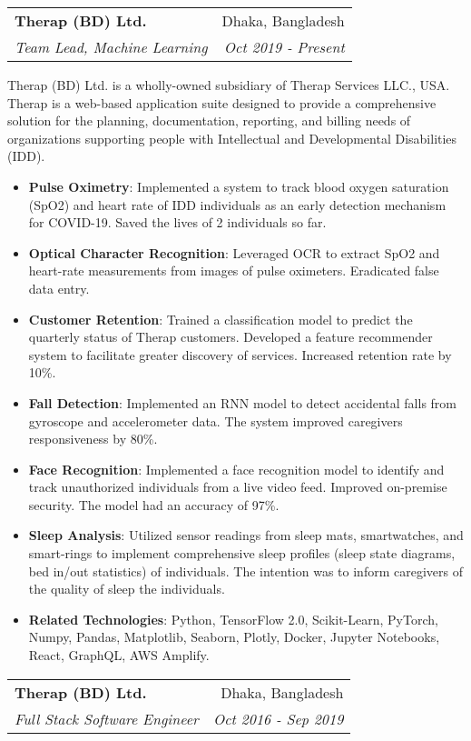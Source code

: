 \documentclass[letterpaper,11pt]{article}
\makeatletter
\newcommand{\resumeItem}[2]{
  \item\small{
    \textbf{#1}{: #2 \vspace{-2pt}}
  }
}
\newcommand{\resumeSubheading}[4]{
  \vspace{-1pt}\item
    \begin{tabular*}{0.97\textwidth}[t]{l@{\extracolsep{\fill}}r}
      \textbf{#1} & #2 \\
      \textit{\small#3} & \textit{\small #4} \\
    \end{tabular*}\vspace{-5pt}
}
\newcommand{\resumeItemListStart}{\begin{itemize}}
\newcommand{\resumeItemListEnd}{\end{itemize}\vspace{-5pt}}
\makeatother
\begin{document}
\resumeSubheading
      {Therap (BD) Ltd.}{Dhaka, Bangladesh}
      {Team Lead, Machine Learning}{Oct 2019 - Present}

      	\begin{flushleft}
			Therap (BD) Ltd. is a wholly-owned subsidiary of Therap Services LLC., USA. Therap is a web-based application suite designed to provide a comprehensive solution for the planning, documentation, reporting, and billing needs of organizations supporting people with Intellectual and Developmental Disabilities (IDD).
      	\end{flushleft}      
      
      \resumeItemListStart
		\resumeItem{Pulse Oximetry}{Implemented a system to track blood oxygen saturation (SpO2) and heart rate of IDD individuals as an early detection mechanism for COVID-19. Saved the lives of 2 individuals so far.}
		\resumeItem{Optical Character Recognition}{Leveraged OCR to extract SpO2 and heart-rate measurements from images of pulse oximeters. Eradicated false data entry.}
		\resumeItem{Customer Retention}{Trained a classification model to predict the quarterly status of Therap customers. Developed a feature recommender system to facilitate greater discovery of services. Increased retention rate by 10\%.}
		\resumeItem{Fall Detection}{Implemented an RNN model to detect accidental falls from gyroscope and accelerometer data. The system improved caregivers responsiveness by 80\%.}
		\resumeItem{Face Recognition}{Implemented a face recognition model to identify and track unauthorized individuals from a live video feed. Improved on-premise security. The model had an accuracy of 97\%.}
		\resumeItem{Sleep Analysis}{Utilized sensor readings from sleep mats, smartwatches, and smart-rings to implement comprehensive sleep profiles (sleep state diagrams, bed in/out statistics) of individuals. The intention was to inform caregivers of the quality of sleep the individuals.}		
        \resumeItem{Related Technologies}
          {Python, TensorFlow 2.0, Scikit-Learn, PyTorch, Numpy, Pandas, Matplotlib, Seaborn, Plotly, Docker, Jupyter Notebooks, React, GraphQL, AWS Amplify.}
      \resumeItemListEnd	
	
    	\resumeSubheading
      		{Therap (BD) Ltd.}{Dhaka, Bangladesh}
      		{Full Stack Software Engineer}{Oct 2016 - Sep 2019}
\end{document}
